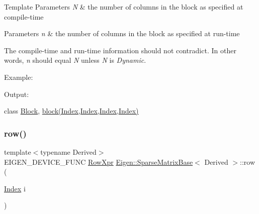 \begin{DoxyTemplParams}{Template Parameters}
{\em N} & the number of columns in the block as specified at compile-\/time \\
\hline
\end{DoxyTemplParams}

\begin{DoxyParams}{Parameters}
{\em n} & the number of columns in the block as specified at run-\/time\\
\hline
\end{DoxyParams}
The compile-\/time and run-\/time information should not contradict. In other words, {\itshape n} should equal {\itshape N} unless {\itshape N} is {\itshape Dynamic}.

Example\+: 
\begin{DoxyCodeInclude}{0}
\end{DoxyCodeInclude}
 Output\+: 
\begin{DoxyVerbInclude}
\end{DoxyVerbInclude}
 class \mbox{\hyperlink{class_eigen_1_1_block}{Block}}, \mbox{\hyperlink{class_eigen_1_1_sparse_matrix_base_a7c28a2f511181c727396d5e813519d38}{block(\+Index,\+Index,\+Index,\+Index)}} \mbox{\label{class_eigen_1_1_sparse_matrix_base_ac0a5563ed3f243f013fb9d2c17e230d0}} 
\subsubsection{\texorpdfstring{row()}{row()}}
{\footnotesize\ttfamily template$<$typename Derived$>$ \\
E\+I\+G\+E\+N\+\_\+\+D\+E\+V\+I\+C\+E\+\_\+\+F\+U\+NC \mbox{\hyperlink{class_eigen_1_1_block}{Row\+Xpr}} \mbox{\hyperlink{class_eigen_1_1_sparse_matrix_base}{Eigen\+::\+Sparse\+Matrix\+Base}}$<$ Derived $>$\+::row (\begin{DoxyParamCaption}\item[{\mbox{\hyperlink{struct_eigen_1_1_eigen_base_a554f30542cc2316add4b1ea0a492ff02}{Index}}}]{i }\end{DoxyParamCaption})\hspace{0.3cm}{\ttfamily [inline]}}

